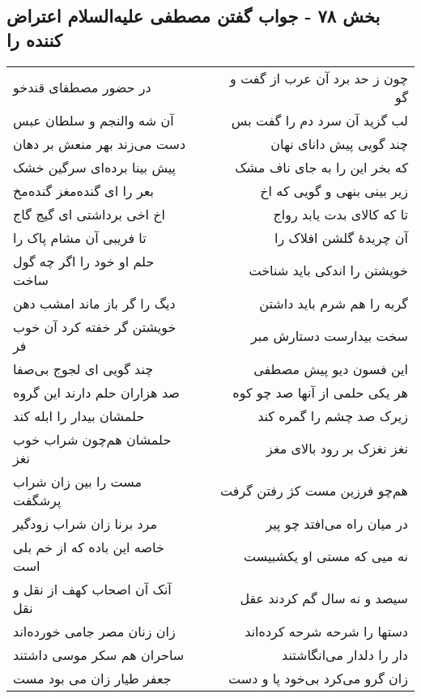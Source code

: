 \begin{center}
\section*{بخش ۷۸ - جواب گفتن مصطفی علیه‌السلام اعتراض کننده را}
\label{sec:sh078}
\begin{longtable}{l p{0.5cm} r}
در حضور مصطفای قندخو
&&
چون ز حد برد آن عرب از گفت و گو
\\
آن شه والنجم و سلطان عبس
&&
لب گزید آن سرد دم را گفت بس
\\
دست می‌زند بهر منعش بر دهان
&&
چند گویی پیش دانای نهان
\\
پیش بینا برده‌ای سرگین خشک
&&
که بخر این را به جای ناف مشک
\\
بعر را ای گنده‌مغز گنده‌مخ
&&
زیر بینی بنهی و گویی که اخ
\\
اخ اخی برداشتی ای گیج گاج
&&
تا که کالای بدت یابد رواج
\\
تا فریبی آن مشام پاک را
&&
آن چریدهٔ گلشن افلاک را
\\
حلم او خود را اگر چه گول ساخت
&&
خویشتن را اندکی باید شناخت
\\
دیگ را گر باز ماند امشب دهن
&&
گربه را هم شرم باید داشتن
\\
خویشتن گر خفته کرد آن خوب فر
&&
سخت بیدارست دستارش مبر
\\
چند گویی ای لجوج بی‌صفا
&&
این فسون دیو پیش مصطفی
\\
صد هزاران حلم دارند این گروه
&&
هر یکی حلمی از آنها صد چو کوه
\\
حلمشان بیدار را ابله کند
&&
زیرک صد چشم را گمره کند
\\
حلمشان هم‌چون شراب خوب نغز
&&
نغز نغزک بر رود بالای مغز
\\
مست را بین زان شراب پرشگفت
&&
هم‌چو فرزین مست کژ رفتن گرفت
\\
مرد برنا زان شراب زودگیر
&&
در میان راه می‌افتد چو پیر
\\
خاصه این باده که از خم بلی است
&&
نه میی که مستی او یکشبیست
\\
آنک آن اصحاب کهف از نقل و نقل
&&
سیصد و نه سال گم کردند عقل
\\
زان زنان مصر جامی خورده‌اند
&&
دستها را شرحه شرحه کرده‌اند
\\
ساحران هم سکر موسی داشتند
&&
دار را دلدار می‌انگاشتند
\\
جعفر طیار زان می بود مست
&&
زان گرو می‌کرد بی‌خود پا و دست
\\
\end{longtable}
\end{center}
